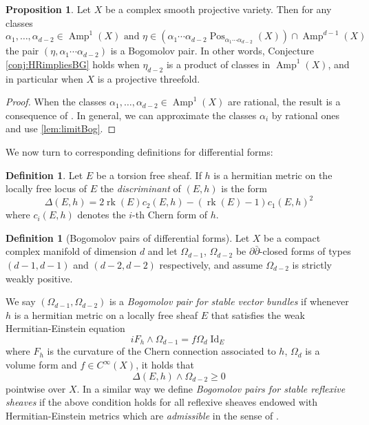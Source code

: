 \documentclass[a4,reqno]{amsart}
\theoremstyle{definition}
\newtheorem{proposition}[theorem]{Proposition}
\newtheorem{definition}[theorem]{Definition}
\DeclareMathOperator{\Amp}{Amp}
\DeclareMathOperator{\Pos}{Pos}
\DeclareMathOperator{\rk}{rk}
\DeclareMathOperator{\Id}{Id}
\numberwithin{equation}{section}
\begin{document}
\begin{proposition}\label{prop:complete_intersections}
    Let $X$ be a complex smooth projective variety. Then for any classes $$\alpha_1,\ldots,\alpha_{d-2}\in\Amp^1(X) \text{ and } \eta\in(\alpha_1\cdots\alpha_{d-2}\Pos_{\alpha_1\cdots \alpha_{d-2}}(X))\cap\Amp^{d-1}(X)$$ the pair $(\eta,\alpha_1 \cdots \alpha_{d-2})$ is a Bogomolov pair. In other words, Conjecture \ref{conj:HRimpliesBG} holds when $\eta_{d-2}$ is a product of classes in $\Amp^1(X)$, and in particular when $X$ is a projective threefold.
\end{proposition}

\begin{proof}

When the classes $\alpha_1,\ldots,\alpha_{d-2}\in\Amp^1(X)$ are rational, the result is a consequence of \cite[Theorem 3.4]{Langer}. In general, we can approximate the classes $\alpha_i$ by rational ones and use \cref{lem:limitBog}.
\end{proof}

We now turn to corresponding definitions for differential forms:

\begin{definition}
Let $E$ be a torsion free sheaf.  If $h$ is a hermitian metric on the locally free locus of $E$ the 
 \emph{discriminant} of $(E,h)$ is the form
$$\Delta(E,h) = 2\rk(E) c_2(E,h)  - (\rk(E)-1) c_1(E,h)^2$$
where $c_i(E,h)$ denotes the $i$-th Chern form of $h$.
\end{definition}




\begin{definition}[Bogomolov pairs of differential forms]\label{def:bogomolovpairsofdifferentialforms}
 Let $X$ be a compact complex manifold of dimension $d$ and let $\Omega_{d-1}$, $\Omega_{d-2}$ be $\partial \bar{\partial}$-closed forms of types $(d-1,d-1)$ and $(d-2,d-2)$ respectively, and assume $\Omega_{d-2}$ is strictly weakly positive. 

    We say $(\Omega_{d-1},\Omega_{d-2})$ is a \emph{Bogomolov pair for stable vector bundles} if whenever $h$ is a hermitian metric on a locally free sheaf $E$ that satisfies the weak Hermitian-Einstein equation
    \begin{equation}i F_h \wedge \Omega_{d-1} = f \Omega_d \Id_E\label{eq:weakHE}\end{equation}
    where $F_h$ is the curvature of the Chern connection associated to $h$, $\Omega_d$ is a volume form and $f\in C^{\infty}(X)$, it holds that $$\Delta(E,h)\wedge \Omega_{d-2}\ge 0$$ pointwise over $X$. 
In a similar way we define {\em Bogomolov pairs for {stable} reflexive sheaves} if the above condition holds for all reflexive sheaves endowed with Hermitian-Einstein metrics which are {\em admissible} in the sense of \cite[Definition]{BandoSiu}. 
    
\end{definition}
\end{document}
